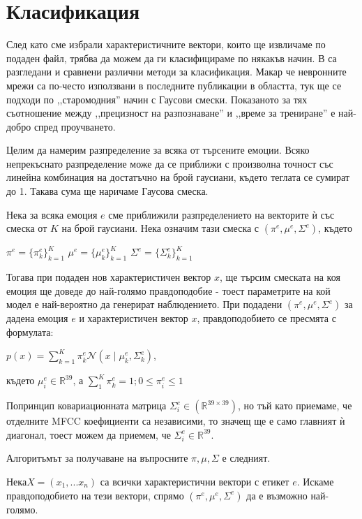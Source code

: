 \documentclass[main.tex]{subfiles}
\begin{document}
\section{Класификация}

След като сме избрали характеристичните вектори, които ще извличаме по подаден файл, трябва да можем да ги класифицираме по някакъв начин.
В \cite{survey} са разгледани и сравнени различни методи за класификация. Макар че невронните мрежи са по-често използвани в последните публикации в областта,
тук ще се подходи по ,,старомодния'' начин с Гаусови смески. Показаното за тях съотношение между ,,прецизност на разпознаване'' и ,,време за трениране'' е най-добро спред проучването.

Целим да намерим разпределение за всяка от търсените емоции. Всяко непрекъснато разпределение може да се приближи с произволна точност със линейна комбинация на достатъчно на брой гаусиани, където теглата се сумират до 1. Такава сума ще наричаме Гаусова смеска. 

Нека за всяка емоция $e$ сме приближили разпределението на векторите ѝ със смеска от $K$ на брой гаусиани. Нека означим тази смеска с $(\pi^e, \mu^e, \Sigma^e)$, където 

$\pi^e = \{\pi_k^e\}_{k=1}^K$
$\mu^e = \{\mu_k^e\}_{k=1}^K$
$\Sigma^e = \{\Sigma_k^e\}_{k=1}^K$

Тогава при подаден нов характеристичен вектор $x$, ще търсим смеската на коя емоция ще доведе до най-голямо правдоподобие - тоест параметрите на кой модел е най-вероятно да генерират наблюдението. При подадени $(\pi^e, \mu^e, \Sigma^e)$ за дадена емоция $e$ и характеристичен вектор $x$, правдоподобието се пресмята с формулата:

$p(x) = \sum\limits_{k=1}^{K} \pi_k^e \mathcal{N}(x\mid \mu_k^e, \Sigma_k^e)$,

където $\mu_i^e \in \mathbb{R}^{39}$, а $\sum\limits_1^K \pi_k^e = 1; 0\leq \pi_i^e\leq 1$

Попринцип ковариационната матрица $\Sigma_i^e \in (\mathbb{R}^{39 \times 39})$, но тъй като приемаме, че отделните MFCC коефициенти са независими, то значещ ще е само главният ѝ диагонал, тоест можем да приемем, че $\Sigma_i^e \in \mathbb{R}^{39}$.

Алгоритъмът за получаване на въпросните $\pi, \mu, \Sigma$ е следният.

Нека$X=(x_1,...x_n)$ са всички характеристични вектори с етикет $e$. Искаме правдоподобието на тези вектори, спрямо $(\pi^e, \mu^e, \Sigma^e)$ да е възможно най-голямо.
\end{document}
